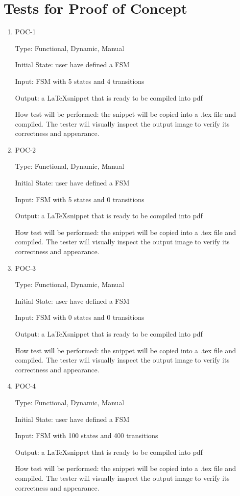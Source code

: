 \documentclass[12pt, titlepage]{article}
\begin{document}
\section{Tests for Proof of Concept}

		
\begin{enumerate}

\item{POC-1\\}

Type: Functional, Dynamic, Manual
					
Initial State: user have defined a FSM
					
Input: FSM with 5 states and 4 transitions
					
Output: a \LaTeX snippet that is ready to be compiled into pdf
					
How test will be performed: the snippet will be copied into a .tex file and
compiled. The tester will visually inspect the output image to verify its
correctness and appearance.


\item{POC-2\\}

  Type: Functional, Dynamic, Manual
  
  Initial State: user have defined a FSM
  
  Input: FSM with 5 states and 0 transitions
  
  Output: a \LaTeX snippet that is ready to be compiled into pdf
  
  How test will be performed: the snippet will be copied into a .tex file and
  compiled. The tester will visually inspect the output image to verify its
  correctness and appearance.
					

\item{POC-3\\}

  Type: Functional, Dynamic, Manual
  
  Initial State: user have defined a FSM
  
  Input: FSM with 0 states and 0 transitions
  
  Output: a \LaTeX snippet that is ready to be compiled into pdf
  
  How test will be performed: the snippet will be copied into a .tex file and
  compiled. The tester will visually inspect the output image to verify its
  correctness and appearance.

\item{POC-4\\}

  Type: Functional, Dynamic, Manual
  
  Initial State: user have defined a FSM
  
  Input: FSM with 100 states and 400 transitions
  
  Output: a \LaTeX snippet that is ready to be compiled into pdf
  
  How test will be performed: the snippet will be copied into a .tex file and
  compiled. The tester will visually inspect the output image to verify its
  correctness and appearance.
\end{enumerate}
	
\end{document}
